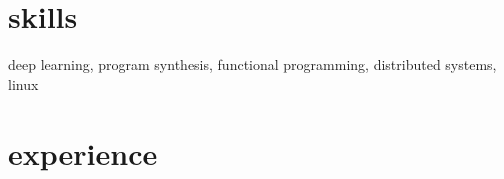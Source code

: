 \documentclass[]{friggeri-cv}
\begin{document}
\section{skills}

deep learning,
program synthesis,
functional programming,
distributed systems,
linux

\section{experience}
\end{document}
